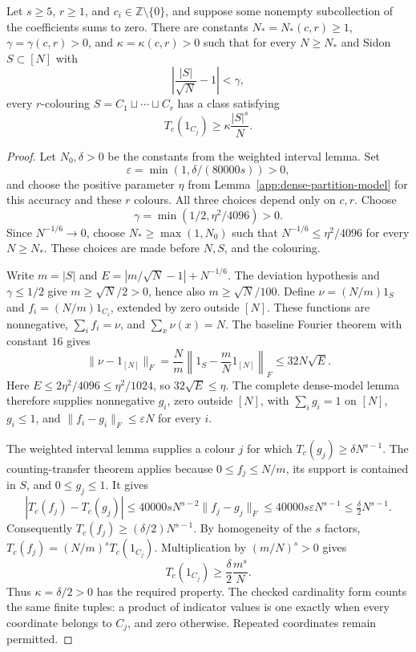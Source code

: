 \begin{theorem}
\label{app:partition-regularity}
\leanok
{}
Let $s\geq5$, $r\geq1$, and $c_i\in\mathbb Z\setminus\{0\}$, and
suppose some nonempty subcollection of the coefficients sums to zero.
There are constants $N_*=N_*(c,r)\geq1$, $\gamma=\gamma(c,r)>0$, and
$\kappa=\kappa(c,r)>0$ such that for every $N\geq N_*$ and Sidon
$S\subset[N]$ with
\[
 \left|\frac{|S|}{\sqrt N}-1\right|<\gamma,
\]
every $r$-colouring $S=C_1\sqcup\cdots\sqcup C_r$ has a class satisfying
\[
 T_c(1_{C_j})\geq\kappa\frac{|S|^s}{N}.
\]
\end{theorem}
\begin{proof}
Let $N_0,\delta>0$ be the constants from the weighted interval lemma.
Set
\[
 \varepsilon=\min(1,\delta/(80000s))>0,
\]
and choose the positive
parameter $\eta$ from Lemma~\ref{app:dense-partition-model} for this
accuracy and these $r$ colours.  All three choices depend only on $c,r$.
Choose
\[
 \gamma=\min(1/2,\eta^2/4096)>0.
\]
Since $N^{-1/6}\to0$, choose $N_*\geq\max(1,N_0)$ such that
$N^{-1/6}\leq\eta^2/4096$ for every $N\geq N_*$.
These choices are made before $N,S$, and the colouring.

Write $m=|S|$ and $E=|m/\sqrt N-1|+N^{-1/6}$.
The deviation hypothesis and $\gamma\leq1/2$ give
$m\geq\sqrt N/2>0$, hence also $m\geq\sqrt N/100$.
Define $\nu=(N/m)1_S$ and $f_i=(N/m)1_{C_i}$, extended by zero
outside $[N]$.  These functions are nonnegative,
$\sum_i f_i=\nu$, and $\sum_x\nu(x)=N$.
The baseline Fourier theorem with constant $16$ gives
\[
 \|\nu-1_{[N]}\|_F
 =\frac Nm\left\|1_S-\frac mN1_{[N]}\right\|_F
 \leq32N\sqrt E.
\]
Here $E\leq2\eta^2/4096\leq\eta^2/1024$, so
$32\sqrt E\leq\eta$.
The complete dense-model lemma therefore supplies nonnegative $g_i$,
zero outside $[N]$, with $\sum_i g_i=1$ on $[N]$, $g_i\leq1$, and
$\|f_i-g_i\|_F\leq\varepsilon N$ for every $i$.

The weighted interval lemma supplies a colour $j$ for which
$T_c(g_j)\geq\delta N^{s-1}$.
The counting-transfer theorem applies because
$0\leq f_j\leq N/m$, its support is contained in $S$, and
$0\leq g_j\leq1$.
It gives
\[
 |T_c(f_j)-T_c(g_j)|
 \leq40000sN^{s-2}\|f_j-g_j\|_F
 \leq40000s\varepsilon N^{s-1}
 \leq\tfrac\delta2N^{s-1}.
\]
Consequently $T_c(f_j)\geq(\delta/2)N^{s-1}$.
By homogeneity of the $s$ factors,
$T_c(f_j)=(N/m)^s T_c(1_{C_j})$.
Multiplication by $(m/N)^s>0$ gives
\[
 T_c(1_{C_j})\geq\frac\delta2\frac{m^s}{N}.
\]
Thus $\kappa=\delta/2>0$ has the required property.
The checked cardinality form counts the same finite tuples: a product of
indicator values is one exactly when every coordinate belongs to $C_j$,
and zero otherwise.  Repeated coordinates remain permitted.
\end{proof}

